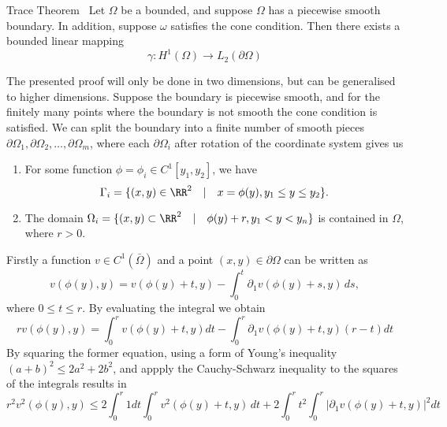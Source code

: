 
\begin{defn}{Trace Theorem}~\label{defn:trace}
    Let $\Omega$ be a bounded, and suppose $\Omega$ has a piecewise smooth boundary. In addition, suppose $\omega$ satisfies the cone condition. Then there exists a bounded linear mapping
    \begin{equation*}
        \gamma : H^1(\Omega) \to L_2(\partial \Omega)
    \end{equation*}
\end{defn}
\begin{bev}
    The presented proof will only be done in two dimensions, but can be generalised to higher dimensions.
    Suppose the boundary is piecewise smooth, and for the finitely many points where the boundary is not smooth the cone condition is satisfied. We can split the boundary into a finite number of smooth pieces $\partial \Omega_1, \partial \Omega_2, \dots, \partial \Omega_m$, where each $\partial \Omega_i$ after rotation of the coordinate system gives us
    \begin{enumerate}
        \item For some function $\phi = \phi_i \in C^1[y_1, y_2]$, we have
            \[ \Gamma_i = \{ (x,y) \in \RR^2 \quad | \quad x = \phi(y), y_1 \leq y \leq y_2 \}. \]
        \item The domain $\Omega_i = \{ (x,y) \subset \RR^2 \quad | \quad \phi(y) + r, y_1 < y < y_n \}$ is contained in $\Omega$, where $r > 0$.
    \end{enumerate}
    Firstly a function $v \in C^1(\bar{\Omega})$ and a point $(x,y) \in \partial \Omega$ can be written as
    \begin{equation}
        v(\phi(y), y) = v(\phi(y) + t, y) - \int_0^t \partial_1 v(\phi(y) + s, y) \, ds,
    \end{equation}
    where $0 \leq t \leq r$. By evaluating the integral we obtain
    \begin{equation}
        r v(\phi(y), y) = \int_0^r v(\phi(y) + t, y) dt - \int_0^r \partial_1 v(\phi(y) + t, y)(r-t) dt
    \end{equation}
    By squaring the former equation, using a form of Young's inequality ${(a+b)}^2 \leq 2a^2 + 2b^2$, and appply the Cauchy-Schwarz inequality to the squares of the integrals results in
    \begin{equation}
        r^2 v^2(\phi(y), y) \leq 2 \int_0^r 1 dt \int_0^r v^2(\phi(y) + t, y) \, dt +  2\int_0^r t^2 \int_0^r | \partial_1  v(\phi(y) + t, y) |^2 dt

\end{equation}
\end{bev}
